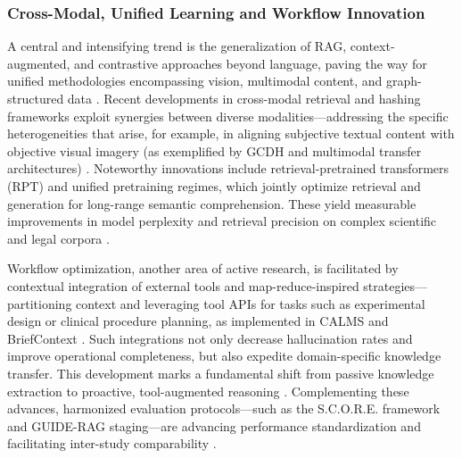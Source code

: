 \documentclass[sigconf]{acmart}
\begin{document}
\subsubsection{Cross-Modal, Unified Learning and Workflow Innovation}

A central and intensifying trend is the generalization of RAG, context-augmented, and contrastive approaches beyond language, paving the way for unified methodologies encompassing vision, multimodal content, and graph-structured data \cite{ref14,ref15,ref20,ref21,ref29,ref30,ref36,ref38,ref54,ref61}. Recent developments in cross-modal retrieval and hashing frameworks exploit synergies between diverse modalities—addressing the specific heterogeneities that arise, for example, in aligning subjective textual content with objective visual imagery (as exemplified by GCDH and multimodal transfer architectures) \cite{ref35,ref38}. Noteworthy innovations include retrieval-pretrained transformers (RPT) and unified pretraining regimes, which jointly optimize retrieval and generation for long-range semantic comprehension. These yield measurable improvements in model perplexity and retrieval precision on complex scientific and legal corpora \cite{ref29,ref31,ref54,ref61}.

Workflow optimization, another area of active research, is facilitated by contextual integration of external tools and map-reduce-inspired strategies—partitioning context and leveraging tool APIs for tasks such as experimental design or clinical procedure planning, as implemented in CALMS and BriefContext \cite{ref5,ref24,ref48}. Such integrations not only decrease hallucination rates and improve operational completeness, but also expedite domain-specific knowledge transfer. This development marks a fundamental shift from passive knowledge extraction to proactive, tool-augmented reasoning \cite{ref28,ref48}. Complementing these advances, harmonized evaluation protocols—such as the S.C.O.R.E. framework and GUIDE-RAG staging—are advancing performance standardization and facilitating inter-study comparability \cite{ref8,ref21,ref28}.
\end{document}
